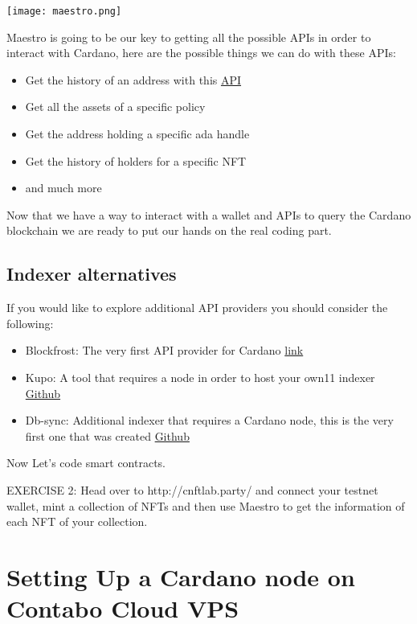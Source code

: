 \texttt{[image: maestro.png]}

Maestro is going to be our key to getting all the possible APIs in order to interact with Cardano, here are the possible things we can do with these APIs:

\begin{itemize}
    \item Get the history of an address with this \href{ttps://docs.gomaestro.org/Indexer-API/Addresses/txs-by-address}{API}
    \item Get all the assets of a specific policy 
    \item Get the address holding a specific ada handle
    \item Get the history of holders for a specific NFT 
    \item and much more 
\end{itemize}

Now that we have a way to interact with a wallet and APIs to query the Cardano blockchain we are ready to put our hands on the real coding part.

\subsection{Indexer alternatives}

If you would like to explore additional API providers you should consider the following:

\begin{itemize}
    \item Blockfrost: The very first API provider for Cardano \href{https://blockfrost.io/dashboard}{link}
    \item Kupo: A tool that requires a node in order to host your own11 indexer \href{https://github.com/CardanoSolutions/kupo}{Github}
    \item Db-sync: Additional indexer that requires a Cardano node, this is the very first one that was created \href{https://github.com/IntersectMBO/cardano-db-sync}{Github}
\end{itemize}

Now Let's code smart contracts.

\begin{remark}
    EXERCISE 2: Head over to http://cnftlab.party/ and connect your testnet wallet, mint a collection of NFTs and then use Maestro to get the information of each NFT of your collection.
\end{remark}


\section{Setting Up a Cardano node on Contabo Cloud VPS}

